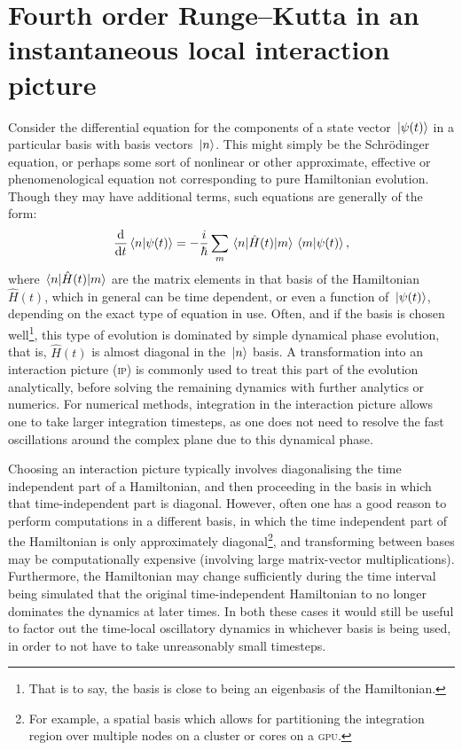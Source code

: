 \setcounter{section}{5}
\section{Fourth order Runge--Kutta in an instantaneous local interaction picture}

Consider the differential equation for the components of a state vector $\ket{\psi(t)}$ in a particular basis with basis vectors $\ket{n}$. This might simply be the Schr\"odinger equation, or perhaps some sort of nonlinear or other approximate, effective or phenomenological equation not corresponding to pure Hamiltonian evolution. Though they may have additional terms, such equations are generally of the form:
\begin{align}\label{eq:real_imag}
\dv t \braket{n}{\psi(t)} = -\frac i \hbar \sum_m \matrixel{n}{\hat H(t)}{m} \braket{m}{\psi(t)},
\end{align}
where $\matrixel{n}{\hat H(t)}{m}$ are the matrix elements in that basis of the Hamiltonian $\hat H(t)$, which in general can be time dependent, or even a function of $\ket{\psi(t)}$, depending on the exact type of equation in use. Often, and if the basis is chosen well\footnote{That is to say, the basis is close to being an eigenbasis of the Hamiltonian.}, this type of evolution is dominated by simple dynamical phase evolution, that is, $\hat H(t)$ is almost diagonal in the $\ket{n}$ basis. A transformation into an interaction picture (\textsc{ip}) is commonly used to treat this part of the evolution analytically, before solving the remaining dynamics with further analytics or numerics. For numerical methods, integration in the interaction picture allows one to take larger integration timesteps, as one does not need to resolve the fast oscillations around the complex plane due to this dynamical phase.

Choosing an interaction picture typically involves diagonalising the time independent part of a Hamiltonian, and then proceeding in the basis in which that time-independent part is diagonal. However, often one has a good reason to perform computations in a different basis, in which the time independent part of the Hamiltonian is only approximately diagonal\footnote{For example, a spatial basis which allows for partitioning the integration region over multiple nodes on a cluster or cores on a \textsc{gpu}.}, and transforming between bases may be computationally expensive (involving large matrix-vector multiplications). Furthermore, the Hamiltonian may change sufficiently during the time interval being simulated that the original time-independent Hamiltonian to no longer dominates the dynamics at later times. In both these cases it would still be useful to factor out the time-local oscillatory dynamics in whichever basis is being used, in order to not have to take unreasonably small timesteps.

